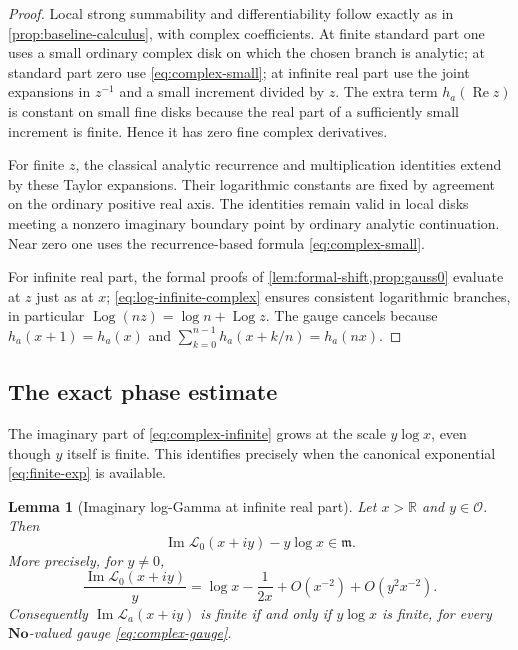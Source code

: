 \documentclass[11pt,letterpaper]{article}
\numberwithin{equation}{section}
\theoremstyle{plain}
\newtheorem{lemma}[lemma]{Lemma}
\theoremstyle{definition}
\theoremstyle{remark}
\newcommand{\No}{\mathbf{No}}
\newcommand{\R}{\mathbb R}
\newcommand{\Ocal}{\mathcal O}
\newcommand{\mi}{\mathfrak m}
\newcommand{\Log}{\operatorname{Log}}
\newcommand{\Imn}{\operatorname{Im}}
\newcommand{\Ren}{\operatorname{Re}}
\newcommand{\Lt}{\mathcal L}
\begin{document}
\begin{proof}
Local strong summability and differentiability follow exactly as in
\cref{prop:baseline-calculus}, with complex coefficients. At finite
standard part one uses a small ordinary complex disk on which the chosen
branch is analytic; at standard part zero use \eqref{eq:complex-small};
at infinite real part use the joint expansions in $z^{-1}$ and a small
increment divided by $z$. The extra term $h_a(\Ren z)$ is constant on
small fine disks because the real part of a sufficiently small increment
is finite. Hence it has zero fine complex derivatives.

For finite $z$, the classical analytic recurrence and multiplication
identities extend by these Taylor expansions. Their logarithmic constants
are fixed by agreement on the ordinary positive real axis. The identities
remain valid in local disks meeting a nonzero imaginary boundary point by
ordinary analytic continuation. Near zero one uses the recurrence-based
formula \eqref{eq:complex-small}.

For infinite real part, the formal proofs of
\cref{lem:formal-shift,prop:gauss0} evaluate at $z$ just as at $x$;
\eqref{eq:log-infinite-complex} ensures consistent logarithmic branches,
in particular $\Log(nz)=\log n+\Log z$. The gauge cancels because
$h_a(x+1)=h_a(x)$ and
$\sum_{k=0}^{n-1}h_a(x+k/n)=h_a(nx)$.
\end{proof}

\subsection{The exact phase estimate}
The imaginary part of \eqref{eq:complex-infinite} grows at the scale
$y\log x$, even though $y$ itself is finite. This identifies precisely when
the canonical exponential \eqref{eq:finite-exp} is available.

\begin{lemma}[Imaginary log-Gamma at infinite real part]\label{lem:phase}
Let $x>\R$ and $y\in\Ocal$. Then
\begin{equation}\label{eq:phase-estimate}
 \Imn\Lt_0(x+iy)-y\log x\in\mi.
\end{equation}
More precisely, for $y\ne0$,
\begin{equation}\label{eq:phase-quotient}
 \frac{\Imn\Lt_0(x+iy)}y
 =\log x-\frac1{2x}+O(x^{-2})+O(y^2x^{-2}).
\end{equation}
Consequently $\Imn\Lt_a(x+iy)$ is finite if and only if $y\log x$ is
finite, for every $\No$-valued gauge \eqref{eq:complex-gauge}.
\end{lemma}
\end{document}
